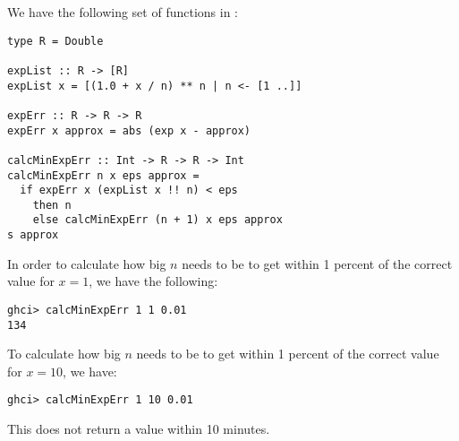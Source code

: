 
We have the following set of functions in :
\begin{verbatim}
type R = Double

expList :: R -> [R]
expList x = [(1.0 + x / n) ** n | n <- [1 ..]]

expErr :: R -> R -> R
expErr x approx = abs (exp x - approx)

calcMinExpErr :: Int -> R -> R -> Int
calcMinExpErr n x eps approx =
  if expErr x (expList x !! n) < eps
    then n
    else calcMinExpErr (n + 1) x eps approx
s approx
\end{verbatim}
In order to calculate how big $n$ needs to be to get within 1 percent of the correct 
value for $x = 1$, we have the following:
\begin{verbatim}
ghci> calcMinExpErr 1 1 0.01
134
\end{verbatim}
To calculate how big $n$ needs to be to get within 1 percent of the correct value for
$x = 10$, we have:
\begin{verbatim}
ghci> calcMinExpErr 1 10 0.01
\end{verbatim}
This does not return a value within 10 minutes.
